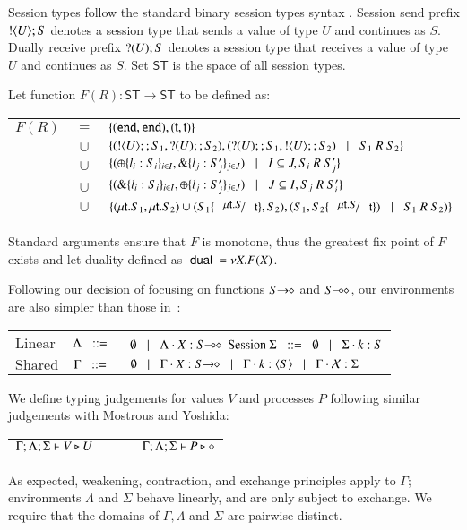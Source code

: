 Session types follow the standard binary session types syntax \cite{}. Session send prefix $! \langle U \rangle ; S$ 
denotes a session type that sends a value of type $U$ and continues as $S$. Dually receive prefix $? (U) ; S$
denotes a session type that receives a value of type $U$ and continues as $S$. 
Set $\mathsf{ST}$ is the space of all session types.
%
\begin{definition}[Duality]
	Let function $F(R): \mathsf{ST} \longrightarrow \mathsf{ST}$ to be defined as:

	\begin{tabular}{rcl}
		$F(R)$ &$=$&		$\{(\mathtt{end}, \mathtt{end}), (\mathsf{t}, \mathsf{t})\}$\\
			&$\cup$&	$\{(! \langle U \rangle ;;S_1, ? (U) ;; S_2), (? (U) ;;S_1, ! \langle U \rangle ;; S_2) \;\;\;|\;\;\; S_1\ R\ S_2\}$\\
			&$\cup$&	$\{(\oplus \{l_i: S_i\}_{i \in I}, \& \{l_j: S_j'\}_{j \in J}) \;\;\;|\;\;\; I \subseteq J, S_i\ R\ S_j'\}$\\
			&$\cup$&	$\{(\& \{l_i: S_i\}_{i \in I}, \oplus \{l_j: S_j'\}_{j \in J}) \;\;\;|\;\;\; J \subseteq I, S_j\ R\ S_i'\}$\\
			&$\cup$&	$\set{(\trec{t}{S_1}, \trec{t}{S_2}) \cup (S_1 \subst{\trec{t}{S}}{\vart{t}}, S_2), (S_1, S_2\subst{\trec{t}{S}}{\vart{t}}) \bnfbar S_1\ R\ S_2)}$
	\end{tabular}

	Standard arguments ensure that $F$ is monotone, thus the greatest fix point
	of $F$ exists and let duality defined as $\ \mathsf{dual}\  = \nu X. F(X)$.
\end{definition}
%
Following our decision of focusing on functions $S\!\! \rightarrow\!\! \diamond$ and $S\!\! \multimap\!\! \diamond$,
our environments are also simpler than those in~\cite{tlca07}:

\begin{tabular}{lcl}
	$\text{Linear}$ & $\Lambda \;\;::=\;\;$ & $\emptyset \;\;\;|\;\;\; \Lambda \cdot X: S\!\! \multimap\!\! \diamond$ \qquad \qquad
	$\text{Session} \ \Sigma \;\;::=\;\; \emptyset \;\;\;|\;\;\; \Sigma \cdot k:S$
	\\
	$\text{Shared}$ & $\Gamma \;\;::=\;\;$ & $\emptyset \;\;\;|\;\;\; \Gamma \cdot X: S\!\! \rightarrow\!\! \diamond \;\;\;|\;\;\; \Gamma \cdot k: \langle S \rangle \;\;\;|\;\;\; \Gamma \cdot \mathcal{X}: \Sigma$
\end{tabular}

We define typing judgements for values $V$ and processes $P$ following similar
judgements with Mostrous and Yoshida:
\begin{center}
	\begin{tabular}{c}
	 $\Gamma; \Lambda; \Sigma \vdash V \triangleright U \qquad \qquad \Gamma; \Lambda; \Sigma \vdash P \triangleright \diamond$
	\end{tabular}
\end{center}
As expected, weakening, contraction, and exchange principles apply to $\Gamma$;
environments $\Lambda$ and $\Sigma$ behave linearly, and are only subject to exchange.
We require that the domains of $\Gamma, \Lambda$ and $\Sigma$ are pairwise distinct.

